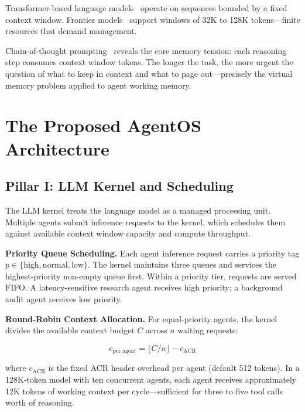 \documentclass[journal]{IEEEtran}
\begin{document}
Transformer-based language models~\cite{vaswani2017attention} operate on sequences bounded by a fixed context window. Frontier models~\cite{openai2023gpt4,brown2020gpt3} support windows of 32K to 128K tokens---finite resources that demand management.

Chain-of-thought prompting~\cite{wei2022cot} reveals the core memory tension: each reasoning step consumes context window tokens. The longer the task, the more urgent the question of what to keep in context and what to page out---precisely the virtual memory problem applied to agent working memory.

\section{The Proposed AgentOS Architecture}
\label{sec:architecture}

\subsection{Pillar I: LLM Kernel and Scheduling}
\label{sec:kernel}

The LLM kernel treats the language model as a managed processing unit. Multiple agents submit inference requests to the kernel, which schedules them against available context window capacity and compute throughput.

\textbf{Priority Queue Scheduling.} Each agent inference request carries a priority tag $p \in \{\text{high}, \text{normal}, \text{low}\}$. The kernel maintains three queues and services the highest-priority non-empty queue first. Within a priority tier, requests are served FIFO. A latency-sensitive research agent receives high priority; a background audit agent receives low priority.

\textbf{Round-Robin Context Allocation.} For equal-priority agents, the kernel divides the available context budget $C$ across $n$ waiting requests:

\begin{equation}
  c_{\text{per agent}} = \lfloor C / n \rfloor - c_{\text{ACR}}
  \label{eq:allocation}
\end{equation}

where $c_{\text{ACR}}$ is the fixed ACR header overhead per agent (default 512 tokens). In a 128K-token model with ten concurrent agents, each agent receives approximately 12K tokens of working context per cycle---sufficient for three to five tool calls worth of reasoning.
\end{document}
